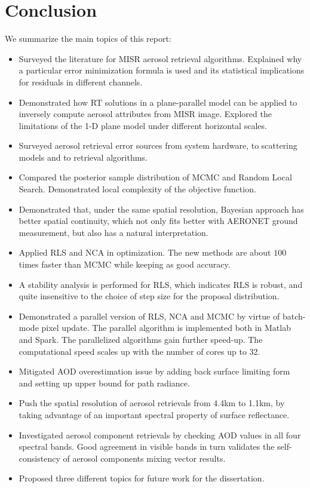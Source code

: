 \section{Conclusion}
We summarize the main topics of this report:
\begin{itemize}
\item Surveyed the literature for MISR aerosol retrieval algorithms. Explained why a particular error minimization formula is used and its statistical implications for residuals in different channels.
\item Demonstrated how RT solutions in a plane-parallel model can be applied to inversely compute aerosol attributes from MISR image. Explored the limitations of the 1-D plane model under different horizontal scales.
\item Surveyed aerosol retrieval error sources from system hardware, to scattering models and to retrieval algorithms.
\item Compared the posterior sample distribution of MCMC and Random Local Search. Demonstrated local complexity of the objective function.
\item Demonstrated that, under the same spatial resolution, Bayesian approach has better spatial continuity, which not only fits better with AERONET ground measurement, but also has a natural interpretation.
\item Applied RLS and NCA in optimization. The new methods are about $100$ times faster than MCMC while keeping as good accuracy.
\item A stability analysis is performed for RLS, which indicates RLS is robust, and quite insensitive to the choice of step size for the proposal distribution.
\item Demonstrated a parallel version of RLS, NCA and MCMC by virtue of batch-mode pixel update. The parallel algorithm is implemented both in Matlab and Spark. The parallelized algorithms gain further speed-up. The computational speed scales up with the number of cores up to 32.
\item Mitigated AOD overestimation issue by adding back surface limiting form and setting up upper bound for path radiance.
\item Push the spatial resolution of aerosol retrievals from 4.4km to 1.1km, by taking advantage of an important spectral property of surface reflectance.
\item Investigated aerosol component retrievals by checking AOD values in all four spectral bands. Good agreement in visible bands in turn validates the self-consistency of aerosol components mixing vector results.
\item Proposed three different topics for future work for the dissertation.

\end{itemize}
